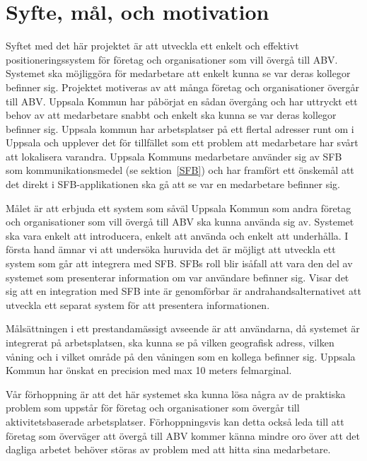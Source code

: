 \documentclass[a4paper,12pt]{article}
\begin{document}


 \section{Syfte, mål, och motivation}\label{syfte_mal_mot}
 Syftet med det här projektet är att utveckla ett enkelt och effektivt positioneringssystem för företag och organisationer som vill övergå till ABV. Systemet ska möjliggöra för medarbetare att enkelt kunna se var deras kollegor befinner sig. Projektet motiveras av att många företag och organisationer övergår till ABV. Uppsala Kommun har påbörjat en sådan övergång och har uttryckt ett behov av att medarbetare snabbt och enkelt ska kunna se var deras kollegor befinner sig. Uppsala kommun har arbetsplatser på ett flertal adresser runt om i Uppsala och upplever det för tillfället som ett problem att medarbetare har svårt att lokalisera varandra.
 Uppsala Kommuns medarbetare använder sig av SFB som kommunikationsmedel (se sektion~\ref{SFB}) och har framfört ett önskemål att det direkt i SFB-applikationen ska gå att se var en medarbetare befinner sig.

 Målet är att erbjuda ett system som såväl Uppsala Kommun som andra företag och organisationer som vill övergå till ABV ska kunna använda sig av. Systemet ska vara enkelt att introducera, enkelt att använda och enkelt att underhålla.
 I första hand ämnar vi att undersöka huruvida det är möjligt att utveckla ett system som går att integrera med SFB. SFBs roll blir isåfall att vara den del av systemet som presenterar information om var användare befinner sig. Visar det sig att en integration med SFB inte är genomförbar är andrahandsalternativet att utveckla ett separat system för att presentera informationen.

 Målsättningen i ett prestandamässigt avseende är att användarna, då systemet är integrerat på arbetsplatsen, ska kunna se på vilken geografisk adress, vilken våning och i vilket område på den våningen som en kollega befinner sig. Uppsala Kommun har önskat en precision med max 10 meters felmarginal.

 Vår förhoppning är att det här systemet ska kunna lösa några av de praktiska problem som uppstår för företag och organisationer som övergår till aktivitetsbaserade arbetsplatser. Förhoppningsvis kan detta också leda till att företag som överväger att övergå till ABV kommer känna mindre oro över att det dagliga arbetet behöver störas av problem med att hitta sina medarbetare.
\end{document}
